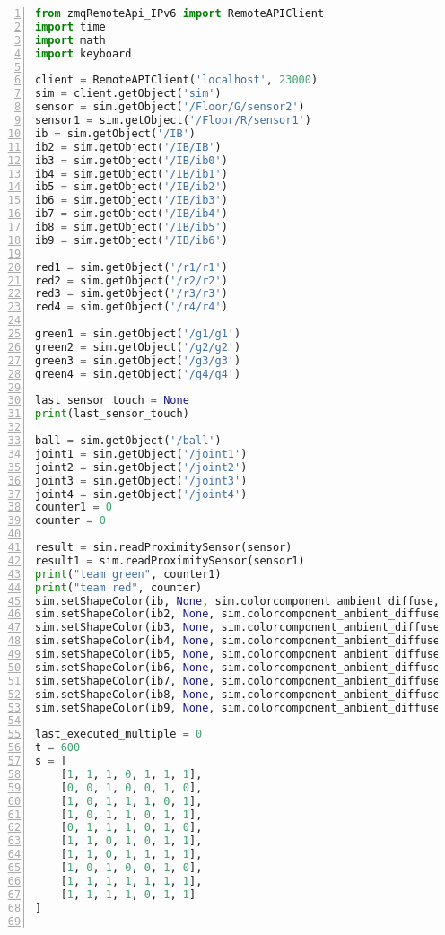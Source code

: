 \begin{lstlisting}[language=Python, frame=single, numbers=left, captionpos=b, basicstyle=\ttfamily\small, showstringspaces=false, breaklines=true, tabsize=4, xleftmargin=15pt]
from zmqRemoteApi_IPv6 import RemoteAPIClient
import time
import math
import keyboard
 
client = RemoteAPIClient('localhost', 23000)
sim = client.getObject('sim')
sensor = sim.getObject('/Floor/G/sensor2')
sensor1 = sim.getObject('/Floor/R/sensor1')
ib = sim.getObject('/IB')
ib2 = sim.getObject('/IB/IB')
ib3 = sim.getObject('/IB/ib0')
ib4 = sim.getObject('/IB/ib1')
ib5 = sim.getObject('/IB/ib2')
ib6 = sim.getObject('/IB/ib3')
ib7 = sim.getObject('/IB/ib4')
ib8 = sim.getObject('/IB/ib5')
ib9 = sim.getObject('/IB/ib6')
 
red1 = sim.getObject('/r1/r1')
red2 = sim.getObject('/r2/r2')
red3 = sim.getObject('/r3/r3')
red4 = sim.getObject('/r4/r4')
 
green1 = sim.getObject('/g1/g1')
green2 = sim.getObject('/g2/g2')
green3 = sim.getObject('/g3/g3')
green4 = sim.getObject('/g4/g4')
 
last_sensor_touch = None
print(last_sensor_touch)
 
ball = sim.getObject('/ball')
joint1 = sim.getObject('/joint1')
joint2 = sim.getObject('/joint2')
joint3 = sim.getObject('/joint3')
joint4 = sim.getObject('/joint4')
counter1 = 0
counter = 0
 
result = sim.readProximitySensor(sensor)
result1 = sim.readProximitySensor(sensor1)
print("team green", counter1)
print("team red", counter)
sim.setShapeColor(ib, None, sim.colorcomponent_ambient_diffuse, [0, 0, 1])
sim.setShapeColor(ib2, None, sim.colorcomponent_ambient_diffuse, [0, 0, 1])
sim.setShapeColor(ib3, None, sim.colorcomponent_ambient_diffuse, [1, 1, 1])
sim.setShapeColor(ib4, None, sim.colorcomponent_ambient_diffuse, [1, 1, 1])
sim.setShapeColor(ib5, None, sim.colorcomponent_ambient_diffuse, [1, 1, 1])
sim.setShapeColor(ib6, None, sim.colorcomponent_ambient_diffuse, [0, 0, 0])
sim.setShapeColor(ib7, None, sim.colorcomponent_ambient_diffuse, [1, 1, 1])
sim.setShapeColor(ib8, None, sim.colorcomponent_ambient_diffuse, [1, 1, 1])
sim.setShapeColor(ib9, None, sim.colorcomponent_ambient_diffuse, [1, 1, 1])
 
last_executed_multiple = 0
t = 600
s = [
    [1, 1, 1, 0, 1, 1, 1],
    [0, 0, 1, 0, 0, 1, 0],
    [1, 0, 1, 1, 1, 0, 1],
    [1, 0, 1, 1, 0, 1, 1],
    [0, 1, 1, 1, 0, 1, 0],
    [1, 1, 0, 1, 0, 1, 1],
    [1, 1, 0, 1, 1, 1, 1],
    [1, 0, 1, 0, 0, 1, 0],
    [1, 1, 1, 1, 1, 1, 1],
    [1, 1, 1, 1, 0, 1, 1]
]
 

\end{lstlisting}
